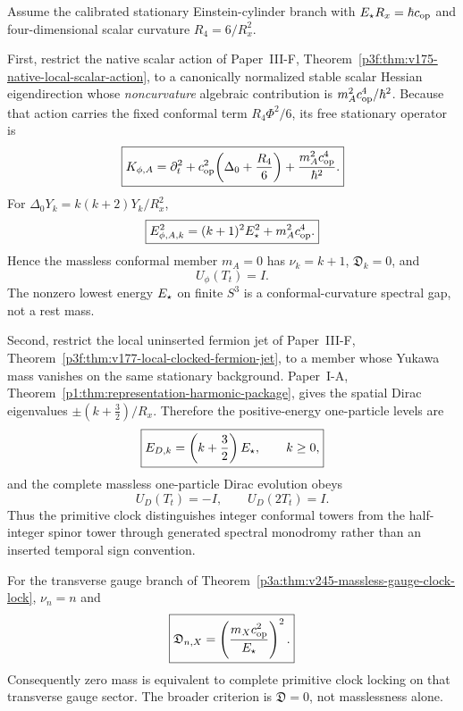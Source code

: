 \documentclass[12pt,a4paper]{article}
\begin{document}
\begin{theorem}
\label{p3a:thm:v247-conformal-clock-hierarchy}
Assume the calibrated stationary Einstein-cylinder branch with
\(E_\star R_x=\hbar c_{\rm op}\) and four-dimensional scalar curvature
\(R_4=6/R_x^2\).

First, restrict the native scalar action of
Paper~III-F, Theorem~\ref{p3f:thm:v175-native-local-scalar-action}, to a
canonically normalized stable scalar Hessian eigendirection whose
\emph{noncurvature} algebraic contribution is
\(m_A^2c_{\rm op}^4/\hbar^2\).  Because that action carries the fixed
conformal term \(R_4\Phi^2/6\), its free stationary operator is
\[
 \boxed{K_{\phi,A}
 =\partial_t^2+c_{\rm op}^2\!\left(\Delta_0+\frac{R_4}{6}\right)
 +\frac{m_A^2c_{\rm op}^4}{\hbar^2}.}
\]
For \(\Delta_0Y_k=k(k+2)Y_k/R_x^2\),
\[
 \boxed{E_{\phi,A,k}^2
 =(k+1)^2E_\star^2+m_A^2c_{\rm op}^4.}
\]
Hence the massless conformal member \(m_A=0\) has
\(\nu_k=k+1\), \(\mathfrak D_k=0\), and
\[
 \boxed{U_\phi(T_t)=I.}
\]
The nonzero lowest energy \(E_\star\) on finite \(S^3\) is a conformal-curvature
spectral gap, not a rest mass.

Second, restrict the local uninserted fermion jet of Paper~III-F,
Theorem~\ref{p3f:thm:v177-local-clocked-fermion-jet}, to a member whose
Yukawa mass vanishes on the same stationary background.  Paper~I-A,
Theorem~\ref{p1:thm:representation-harmonic-package}, gives the spatial
Dirac eigenvalues \(\pm(k+\tfrac32)/R_x\).  Therefore the positive-energy
one-particle levels are
\[
 \boxed{E_{D,k}=\left(k+\frac32\right)E_\star,\qquad k\ge0,}
\]
and the complete massless one-particle Dirac evolution obeys
\[
 \boxed{U_D(T_t)=-I,\qquad U_D(2T_t)=I.}
\]
Thus the primitive clock distinguishes integer conformal towers from the
half-integer spinor tower through generated spectral monodromy rather than an
inserted temporal sign convention.

For the transverse gauge branch of
Theorem~\ref{p3a:thm:v245-massless-gauge-clock-lock},
\(\nu_n=n\) and
\[
 \boxed{\mathfrak D_{n,X}
 =\left(\frac{m_Xc_{\rm op}^2}{E_\star}\right)^2.}
\]
Consequently zero mass is equivalent to complete primitive
clock locking on that transverse gauge sector.  The broader
criterion is \(\mathfrak D=0\), not masslessness alone.
\end{theorem}
\end{document}
